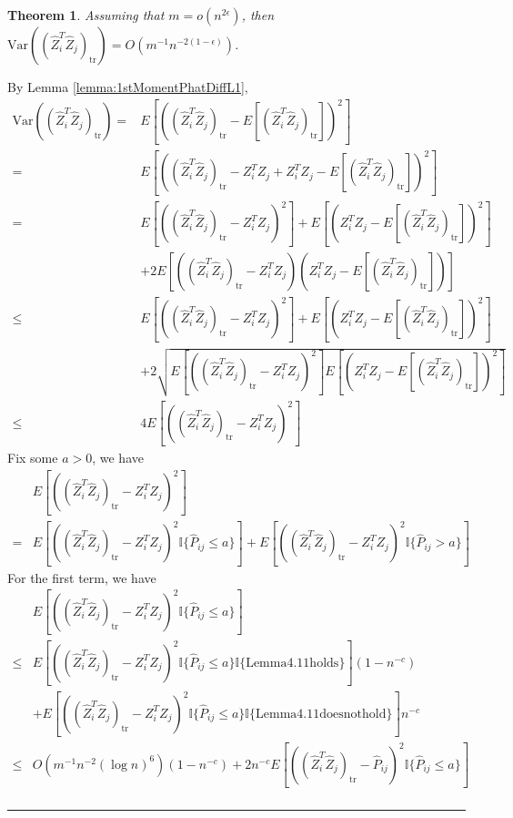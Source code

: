 \documentclass[a4paper]{article}
\newenvironment{proof}{{\bf Proof:  }}{\hfill\rule{2mm}{2mm}}
\newtheorem{theorem}[fact]{Theorem}
\begin{document}
\begin{theorem}
\label{thm:VarASEL1}
Assuming that $m = o(n^{2\epsilon})$, then $\mathrm{Var}((\hat{Z}_i^T \hat{Z}_j)_{\mathrm{tr}}) = O(m^{-1} n^{-2(1-\epsilon)})$.
\end{theorem}
\begin{proof}
By Lemma \ref{lemma:1stMomentPhatDiffL1},
\begin{align*}
	\mathrm{Var}((\hat{Z}_i^T \hat{Z}_j)_{\mathrm{tr}})
    = & E[((\hat{Z}_i^T \hat{Z}_j)_{\mathrm{tr}} - E[(\hat{Z}_i^T \hat{Z}_j)_{\mathrm{tr}}])^2] \\
    = & E[((\hat{Z}_i^T \hat{Z}_j)_{\mathrm{tr}} - Z_i^T Z_j + Z_i^T Z_j - E[(\hat{Z}_i^T \hat{Z}_j)_{\mathrm{tr}}])^2] \\
    = & E[((\hat{Z}_i^T \hat{Z}_j)_{\mathrm{tr}} - Z_i^T Z_j)^2] + E[(Z_i^T Z_j - E[(\hat{Z}_i^T \hat{Z}_j)_{\mathrm{tr}}])^2] \\ 
    & + 2E[((\hat{Z}_i^T \hat{Z}_j)_{\mathrm{tr}} - Z_i^T Z_j)(Z_i^T Z_j - E[(\hat{Z}_i^T \hat{Z}_j)_{\mathrm{tr}}])] \\
    \le & E[((\hat{Z}_i^T \hat{Z}_j)_{\mathrm{tr}} - Z_i^T Z_j)^2] + E[(Z_i^T Z_j - E[(\hat{Z}_i^T \hat{Z}_j)_{\mathrm{tr}}])^2] \\ 
    & + 2\sqrt{E[((\hat{Z}_i^T \hat{Z}_j)_{\mathrm{tr}} - Z_i^T Z_j)^2] E[(Z_i^T Z_j - E[(\hat{Z}_i^T \hat{Z}_j)_{\mathrm{tr}}])^2]} \\
    \le & 4 E[((\hat{Z}_i^T \hat{Z}_j)_{\mathrm{tr}} - Z_i^T Z_j)^2]
\end{align*}
Fix some $a > 0$, we have
\begin{align*}
	& E[((\hat{Z}_i^T \hat{Z}_j)_{\mathrm{tr}} - Z_i^T Z_j)^2] \\
	= & E[((\hat{Z}_i^T \hat{Z}_j)_{\mathrm{tr}} - Z_i^T Z_j)^2 \mathbb{I}\{\hat{P}_{ij} \le a\}]
	+ E[((\hat{Z}_i^T \hat{Z}_j)_{\mathrm{tr}} - Z_i^T Z_j)^2 \mathbb{I}\{\hat{P}_{ij} > a\}]
\end{align*}
For the first term, we have
\begin{align*}
	& E[((\hat{Z}_i^T \hat{Z}_j)_{\mathrm{tr}} - Z_i^T Z_j)^2 \mathbb{I}\{\hat{P}_{ij} \le a\}] \\
	\le & E[((\hat{Z}_i^T \hat{Z}_j)_{\mathrm{tr}} - Z_i^T Z_j)^2 \mathbb{I}\{\hat{P}_{ij} \le a\} \mathbb{I}\{\mathrm{Lemma 4.11 holds}\}] (1 - n^{-c}) \\
	& + E[((\hat{Z}_i^T \hat{Z}_j)_{\mathrm{tr}} - Z_i^T Z_j)^2 \mathbb{I}\{\hat{P}_{ij} \le a\} \mathbb{I}\{\mathrm{Lemma 4.11 does not hold}\}] n^{-c} \\
	\le & O(m^{-1} n^{-2} (\log n)^6) (1 - n^{-c}) + 2 n^{-c} E[((\hat{Z}_i^T \hat{Z}_j)_{\mathrm{tr}} - \hat{P}_{ij})^2 \mathbb{I}\{\hat{P}_{ij} \le a\}] \\

\end{align*}
\end{proof}
\end{document}
